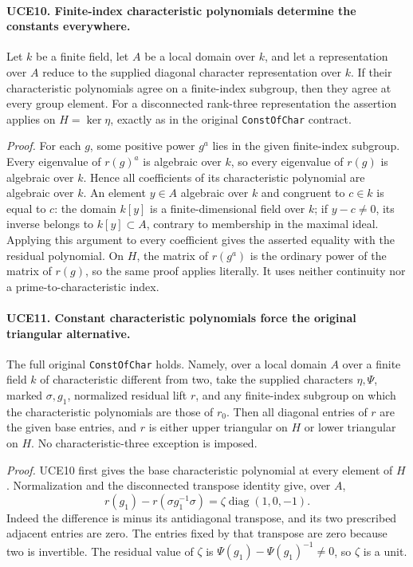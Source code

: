 \paragraph{UCE10. Finite-index characteristic polynomials determine the constants everywhere.}
\label{claim:UCE10}
Let \(k\) be a finite field, let \(A\) be a local domain over
\(k\), and let a representation over \(A\) reduce to the supplied
diagonal character representation over \(k\).  If their
characteristic polynomials agree on a finite-index subgroup, then
they agree at every group element.  For a disconnected rank-three
representation the assertion applies on \(H=\ker\eta\), exactly
as in the original \texttt{ConstOfChar} contract.

\emph{Proof.}
For each \(g\), some positive power \(g^a\) lies in the
given finite-index subgroup.  Every eigenvalue of \(r(g)^a\)
is algebraic over \(k\), so every eigenvalue of \(r(g)\) is
algebraic over \(k\).  Hence all coefficients of its characteristic
polynomial are algebraic over \(k\).
An element \(y\in A\) algebraic over \(k\) and congruent to
\(c\in k\) is equal to \(c\): the domain \(k[y]\) is a
finite-dimensional field over \(k\); if \(y-c\ne0\), its
inverse belongs to \(k[y]\subset A\), contrary to membership
in the maximal ideal.  Applying this argument to every coefficient
gives the asserted equality with the residual polynomial.
On \(H\), the matrix of \(r(g^a)\) is the ordinary power
of the matrix of \(r(g)\), so the same proof applies literally.
It uses neither continuity nor a prime-to-characteristic index.

\paragraph{UCE11. Constant characteristic polynomials force the original triangular alternative.}
\label{claim:UCE11}
The full original \texttt{ConstOfChar} holds.  Namely, over a local
domain \(A\) over a finite field \(k\) of characteristic different
from two, take the supplied characters \(\eta,\Psi\), marked
\(\sigma,g_1\), normalized residual lift \(r\), and any
finite-index subgroup on which the characteristic polynomials are
those of \(r_0\).  Then all diagonal entries of \(r\) are the
given base entries, and \(r\) is either upper triangular on \(H\)
or lower triangular on \(H\).  No characteristic-three exception
is imposed.

\emph{Proof.}
UCE10 first gives the base characteristic polynomial at every
element of \(H\).  Normalization and the disconnected transpose
identity give, over \(A\),
\[
 r(g_1)-r(\sigma g_1^{-1}\sigma)
       =\zeta\operatorname{diag}(1,0,-1).
 \tag{UCE.7}
\]
Indeed the difference is minus its antidiagonal transpose, and its
two prescribed adjacent entries are zero.  The entries fixed by
that transpose are zero because two is invertible.  The residual
value of \(\zeta\) is \(\Psi(g_1)-\Psi(g_1)^{-1}\ne0\),
so \(\zeta\) is a unit.

